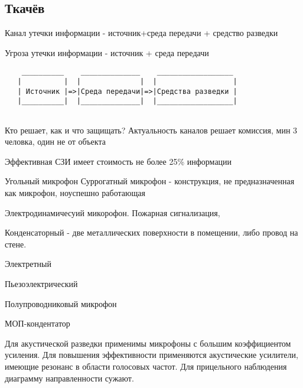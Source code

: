 \documentclass[a4paper,12pt]{report}
\begin{document}
	\def \nocredits {}
	\def \LineE {Конспект по дисциплине}
	\def \LineF {Организационно-правовые основы ИБ}

	\maketitle


\subsection*{Ткачёв}

Канал утечки информации - источник+среда передачи + средство разведки

Угроза утечки информации - источник + среда передачи


\begin{verbatim}
    __________    ______________    __________________
   |          |  |              |  |                  |                      
   | Источник |=>|Среда передачи|=>|Средства разведки |                                 
   |__________|  |______________|  |__________________|                         
                                                                                 
\end{verbatim}

Кто решает, как и что защищать? 
Актуальность каналов решает комиссия, мин 3 человка, один не от объекта
	
	
Эффективная СЗИ имеет стоимость не более 25\% информации
	
Угольный микрофон
Суррогатный микрофон - конструкция, не предназначенная как микрофон, ноуспешно работающая

Электродинамичесуий микорофон. Пожарная сигнализация, 

Конденсаторный - две металлических поверхности в помещении, либо провод на стене.

Электретный

Пьезоэлектрический 



Полупроводниковый микрофон

МОП-кондентатор
	
	


Для акустической разведки применимы микрофоны с большим коэффициентом усиления. Для повышения эффективности применяются акустические усилители, имеющие резонанс в области голосовых частот. 
Для прицельного наблюдения диаграмму направленности сужают.
\end{document}
